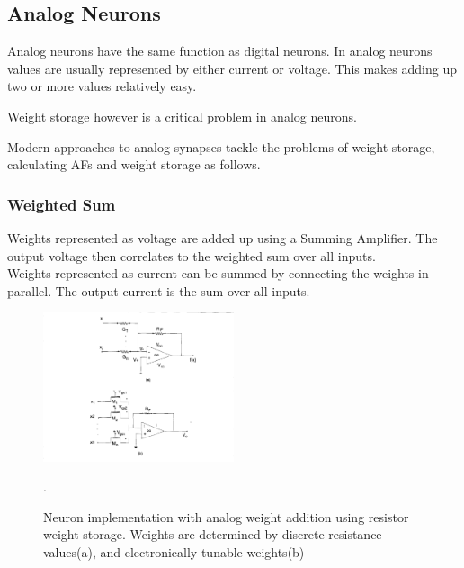 \documentclass[conference]{IEEEtran}
\begin{document}



    \subsection{Analog Neurons}

    Analog neurons have the same function as digital neurons.
    In analog neurons values are usually represented by either current or voltage.
    This makes adding up two or more values relatively easy.

    Weight storage however is a critical problem in analog neurons.

    Modern approaches to analog synapses tackle the problems of weight storage, calculating AFs and weight storage as follows.

    \subsubsection{Weighted Sum}

    Weights represented as voltage are added up using a Summing Amplifier.
    The output voltage then correlates to the weighted sum over all inputs.\\

    Weights represented as current can be summed by connecting the weights in parallel.
    The output current is the sum over all inputs.

    \begin{figure}[h]
        \centering
        \includegraphics[width=0.5\textwidth]{resources/analog-weights.png}
        \caption{Neuron implementation with analog weight addition using resistor weight storage.
        Weights are determined by discrete resistance values(a), and electronically tunable weights(b)~\cite[Fig.~1]{zurada1992analog}}.
        \label{fig:analogweights}
    \end{figure}
\end{document}

